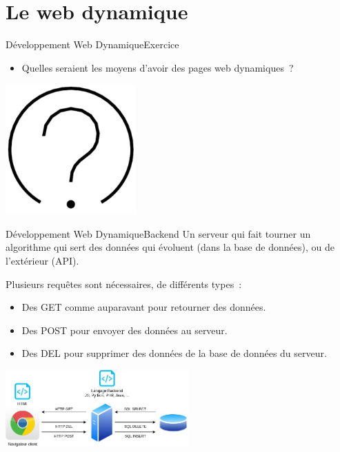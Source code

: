\documentclass{beamer}
\begin{document}
    \section{Le web dynamique}\label{sec:Dynamic}
    \begin{frame}{Développement Web Dynamique}{Exercice \execcounterdispinc{}}
        \begin{itemize}
            \item Quelles seraient les moyens d'avoir des pages web dynamiques~?
        \end{itemize}
        \bigbreak
        \centering
        \includegraphics[width=5cm]{image/question-mark}
    \end{frame}

    \begin{frame}{Développement Web Dynamique}{Backend}
        Un serveur qui fait tourner un algorithme qui sert des données qui évoluent (dans la base de données), ou de l'extérieur (API).

        Plusieurs requêtes sont nécessaires, de différents types~:
        \begin{itemize}
            \item Des GET comme auparavant pour retourner des données.
            \item Des POST pour envoyer des données au serveur.
            \item Des DEL pour supprimer des données de la base de données du serveur.
        \end{itemize}
        \bigbreak
        \centering
        \includegraphics[width=7cm]{image/web-dynamic-backend}
    \end{frame}
\end{document}
